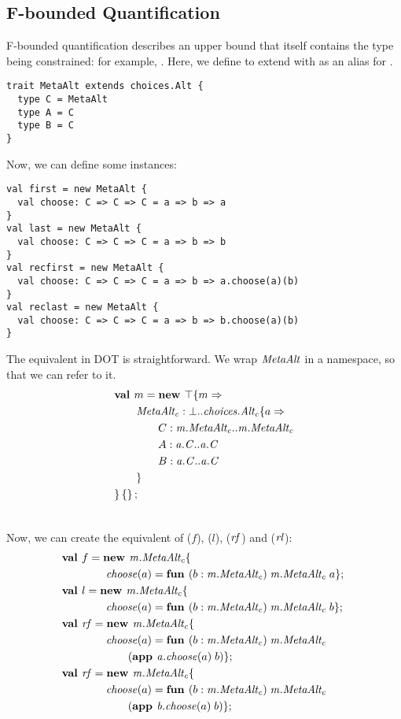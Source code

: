 \documentclass[9pt]{sigplanconf}
\begin{document}
\subsection{F-bounded Quantification}

F-bounded quantification describes an upper bound that itself contains
the type being constrained: for example, .
Here, we define  to extend
 with  as an alias for .

\begin{lstlisting}
trait MetaAlt extends choices.Alt {
  type C = MetaAlt
  type A = C
  type B = C
}
\end{lstlisting}

Now, we can define some  instances:
\begin{lstlisting}
val first = new MetaAlt {
  val choose: C => C => C = a => b => a
}
val last = new MetaAlt {
  val choose: C => C => C = a => b => b
}
val recfirst = new MetaAlt {
  val choose: C => C => C = a => b => a.choose(a)(b)
}
val reclast = new MetaAlt {
  val choose: C => C => C = a => b => b.choose(a)(b)
}
\end{lstlisting}

The equivalent in DOT is straightforward. We wrap $\mathit{MetaAlt}$ in a
namespace, so that we can refer to it.
\begin{align*}
&\textbf{val }m = \textbf{new }\top \{m \Rightarrow \\
&\quad\quad\mathit{MetaAlt_c} : \bot..{\mathit{choices.Alt_c}} \{a \Rightarrow \\
&\quad\quad\quad\quad C : \mathit{m.MetaAlt_c}..\mathit{m.MetaAlt_c}\\
&\quad\quad\quad\quad A : \mathit{a.C}..\mathit{a.C}\\
&\quad\quad\quad\quad B : \mathit{a.C}..\mathit{a.C}\\
&\quad\quad \}\\
& \}\left\{\right\} ;\;\\&
\end{align*}

Now, we can create the equivalent of  ($f$), 
($l$),  ($\mathit{rf}$) and  ($\mathit{rl}$):
\begin{align*}
&\mlnew f {{\mi{m.MetaAlt_c}}\mlldefs{\\
&\gap\gap\mi{choose}(a)=\fun b {\mi{m.MetaAlt_c}} {\mi{m.MetaAlt_c}} a}}{
\mlnew l {{\mi{m.MetaAlt_c}}\mlldefs{\\
&\gap\gap\mi{choose}(a)=\fun b {\mi{m.MetaAlt_c}} {\mi{m.MetaAlt_c}} b}}{
\mlnew {\mi{rf}} {{\mi{m.MetaAlt_c}}\mlldefs{\\
&\gap\gap\mi{choose}(a)=\fun b {\mi{m.MetaAlt_c}} {\mi{m.MetaAlt_c}} {\\
&\gap\gap\gap \app {{\mi{a.choose}}(a)} b}}}{
\mlnew {\mi{rf}} {{\mi{m.MetaAlt_c}}\mlldefs{\\
&\gap\gap\mi{choose}(a)=\fun b {\mi{m.MetaAlt_c}} {\mi{m.MetaAlt_c}} {\\
&\gap\gap\gap \app {{\mi{b.choose}}(a)} b}}}{
}}}}
\end{align*}
\end{document}
